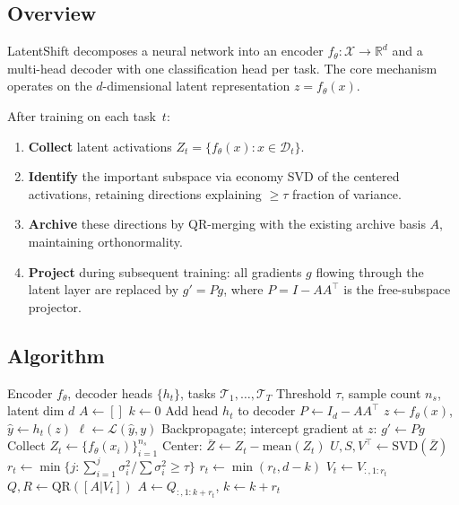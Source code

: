 \documentclass{article}
\newcommand{\real}{\mathbb{R}}
\begin{document}
\subsection{Overview}

LatentShift decomposes a neural network into an encoder $f_\theta: \mathcal{X}
\to \real^d$ and a multi-head decoder with one classification head per task.
The core mechanism operates on the $d$-dimensional latent representation
$z = f_\theta(x)$.

After training on each task~$t$:
\begin{enumerate}
    \item \textbf{Collect} latent activations $Z_t = \{f_\theta(x) : x \in \mathcal{D}_t\}$.
    \item \textbf{Identify} the important subspace via economy SVD of the
          centered activations, retaining directions explaining $\geq \tau$
          fraction of variance.
    \item \textbf{Archive} these directions by QR-merging with the existing
          archive basis $A$, maintaining orthonormality.
    \item \textbf{Project} during subsequent training: all gradients $g$
          flowing through the latent layer are replaced by $g' = Pg$, where
          $P = I - AA^\top$ is the free-subspace projector.
\end{enumerate}

\subsection{Algorithm}

\begin{algorithm}[t]
\caption{LatentShift: Continual Learning via Latent Shifting}
\label{alg:latentshift}
\begin{algorithmic}[1]
\REQUIRE Encoder $f_\theta$, decoder heads $\{h_t\}$, tasks $\mathcal{T}_1, \ldots, \mathcal{T}_T$
\REQUIRE Threshold $\tau$, sample count $n_s$, latent dim $d$
\STATE $A \gets []$ \hfill {}
\STATE $k \gets 0$ \hfill {}
    \STATE Add head $h_t$ to decoder
    \STATE $P \gets I_d - AA^\top$ \hfill {}
            \STATE $z \gets f_\theta(x)$, $\hat{y} \gets h_t(z)$
            \STATE $\ell \gets \mathcal{L}(\hat{y}, y)$
            \STATE Backpropagate; intercept gradient at $z$: $g' \gets Pg$
        \ENDFOR
    \ENDFOR
    \STATE Collect $Z_t \gets \{f_\theta(x_i)\}_{i=1}^{n_s}$
    \STATE Center: $\bar{Z} \gets Z_t - \text{mean}(Z_t)$
    \STATE $U, S, V^\top \gets \text{SVD}(\bar{Z})$
    \STATE $r_t \gets \min\{j : \sum_{i=1}^j \sigma_i^2 / \sum \sigma_i^2 \geq \tau\}$
    \STATE $r_t \gets \min(r_t, d - k)$
    \STATE $V_t \gets V_{:, 1:r_t}$ \hfill {}
    \STATE $Q, R \gets \text{QR}([A | V_t])$ \hfill {}
    \STATE $A \gets Q_{:, 1:k+r_t}$, $k \gets k + r_t$
\ENDFOR
\end{algorithmic}
\end{algorithm}
\end{document}
